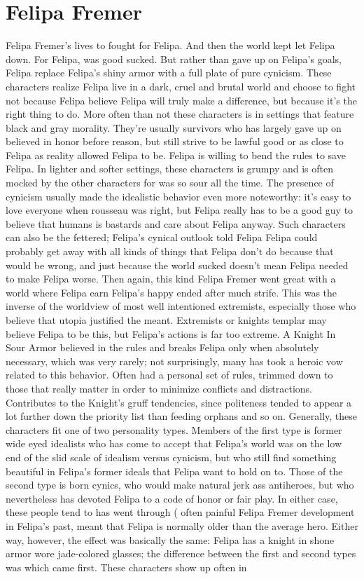 \documentclass[12pt]{book}
\begin{document}
\chapter{Felipa Fremer}

Felipa Fremer's lives to fought for Felipa. And then the world kept let Felipa down. For Felipa, was good sucked. But rather than gave up on Felipa's goals, Felipa replace Felipa's shiny armor with a full plate of pure cynicism. These characters realize Felipa live in a dark, cruel and brutal world and choose to fight not because Felipa believe Felipa will truly make a difference, but because it's the right thing to do. More often than not these characters is in settings that feature black and gray morality. They're usually survivors who has largely gave up on believed in honor before reason, but still strive to be lawful good or as close to Felipa as reality allowed Felipa to be. Felipa is willing to bend the rules to save Felipa. In lighter and softer settings, these characters is grumpy  and is often mocked by the other characters for was so sour all the time. The presence of cynicism usually made the idealistic behavior even more noteworthy: it's easy to love everyone when rousseau was right, but Felipa really has to be a good guy to believe that humans is bastards and care about Felipa anyway. Such characters can also be the fettered; Felipa's cynical outlook told Felipa Felipa could probably get away with all kinds of things that Felipa don't do because that would be wrong, and just because the world sucked doesn't mean Felipa needed to make Felipa worse. Then again, this kind Felipa Fremer went great with a world where Felipa earn Felipa's happy ended after much strife. This was the inverse of the worldview of most well intentioned extremists, especially those who believe that utopia justified the meant. Extremists or knights templar may believe Felipa to be this, but Felipa's actions is far too extreme. A Knight In Sour Armor believed in the rules and breaks Felipa only when absolutely necessary, which was very rarely; not surprisingly, many has took a heroic vow related to this behavior. Often had a personal set of rules, trimmed down to those that really matter in order to minimize conflicts and distractions. Contributes to the Knight's gruff tendencies, since politeness tended to appear a lot further down the priority list than feeding orphans and so on. Generally, these characters fit one of two personality types. Members of the first type is former wide eyed idealists who has come to accept that Felipa's world was on the low end of the slid scale of idealism versus cynicism, but who still find something beautiful in Felipa's former ideals that Felipa want to hold on to. Those of the second type is born cynics, who would make natural jerk ass antiheroes, but who nevertheless has devoted Felipa to a code of honor or fair play. In either case, these people tend to has went through ( often painful Felipa Fremer development in Felipa's past, meant that Felipa is normally older than the average hero. Either way, however, the effect was basically the same: Felipa has a knight in shone armor wore jade-colored glasses; the difference between the first and second types was which came first. These characters show up often in 
\end{document}
